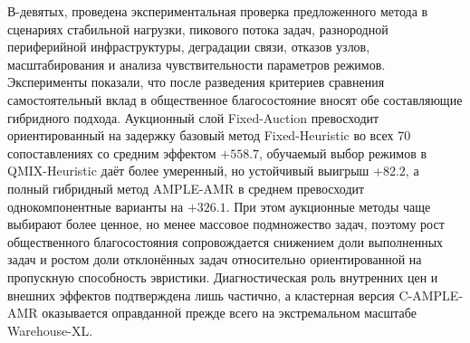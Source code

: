 В-девятых, проведена экспериментальная проверка предложенного метода в сценариях стабильной нагрузки, пикового потока задач, разнородной периферийной инфраструктуры, деградации связи, отказов узлов, масштабирования и анализа чувствительности параметров режимов. Эксперименты показали, что после разведения критериев сравнения самостоятельный вклад в общественное благосостояние вносят обе составляющие гибридного подхода. Аукционный слой Fixed-Auction превосходит ориентированный на задержку базовый метод Fixed-Heuristic во всех 70 сопоставлениях со средним эффектом $+558.7$, обучаемый выбор режимов в QMIX-Heuristic даёт более умеренный, но устойчивый выигрыш $+82.2$, а полный гибридный метод AMPLE-AMR в среднем превосходит однокомпонентные варианты на $+326.1$. При этом аукционные методы чаще выбирают более ценное, но менее массовое подмножество задач, поэтому рост общественного благосостояния сопровождается снижением доли выполненных задач и ростом доли отклонённых задач относительно ориентированной на пропускную способность эвристики. Диагностическая роль внутренних цен и внешних эффектов подтверждена лишь частично, а кластерная версия C-AMPLE-AMR оказывается оправданной прежде всего на экстремальном масштабе Warehouse-XL.

